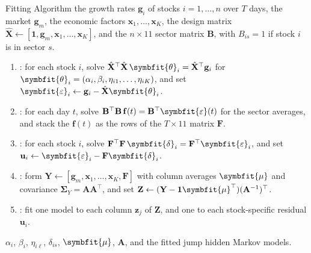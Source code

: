 \documentclass[aspectratio=169,11pt]{beamer}
\begin{document}
\begin{frame}{Fitting Algorithm}
  \vspace{0.1em}\small
  \textbf{} the growth rates $\mathbf{g}_{i}$ of stocks $i=1,\dots,n$ over $T$
  days, the market $\mathbf{g}_{m}$, the economic factors $\mathbf{x}_{1},\dots,\mathbf{x}_{K}$, the
  design matrix $\hat{\mathbf{X}}\gets[\mathbf{1},\mathbf{g}_{m},\mathbf{x}_{1},\dots,\mathbf{x}_{K}]$,
  and the $n\times 11$ sector matrix $\mathbf{B}$, with $B_{is}=1$ if stock $i$ is in sector $s$.
  \begin{enumerate}\setlength{\itemsep}{0.15em}
    \item {}: for each stock $i$, solve
      $\hat{\mathbf{X}}^{\top}\hat{\mathbf{X}}\,\symbfit{\theta}_{i}=\hat{\mathbf{X}}^{\top}\mathbf{g}_{i}$
      for $\symbfit{\theta}_{i}=(\alpha_{i},\beta_{i},\eta_{i1},\dots,\eta_{iK})$, and set
      $\symbfit{\varepsilon}_{i}\gets\mathbf{g}_{i}-\hat{\mathbf{X}}\symbfit{\theta}_{i}$.
    \item {}: for each day $t$, solve
      $\mathbf{B}^{\top}\mathbf{B}\,\mathbf{f}(t)=\mathbf{B}^{\top}\symbfit{\varepsilon}(t)$ for the sector averages, and stack
      the $\mathbf{f}(t)$ as the rows of the $T\times 11$ matrix $\mathbf{F}$.
    \item {}: for each stock $i$, solve
      $\mathbf{F}^{\top}\mathbf{F}\,\symbfit{\delta}_{i}=\mathbf{F}^{\top}\symbfit{\varepsilon}_{i}$,
      and set $\mathbf{u}_{i}\gets\symbfit{\varepsilon}_{i}-\mathbf{F}\symbfit{\delta}_{i}$.
    \item {}: form
      $\mathbf{Y}\gets[\mathbf{g}_{m},\mathbf{x}_{1},\dots,\mathbf{x}_{K},\mathbf{F}]$ with column
      averages $\symbfit{\mu}$ and covariance $\symbf{\Sigma}_{Y}=\mathbf{A}\mathbf{A}^{\top}$, and
      set $\mathbf{Z}\gets(\mathbf{Y}-\mathbf{1}\symbfit{\mu}^{\top})(\mathbf{A}^{-1})^{\top}$.
    \item {}: fit one model to each column
      $\mathbf{z}_{j}$ of $\mathbf{Z}$, and one to each stock-specific residual $\mathbf{u}_{i}$.
  \end{enumerate}
  \textbf{} $\alpha_{i}$, $\beta_{i}$, $\eta_{i\ell}$, $\delta_{is}$, $\symbfit{\mu}$,
  $\mathbf{A}$, and the fitted jump hidden Markov models.
\end{frame}
\end{document}
